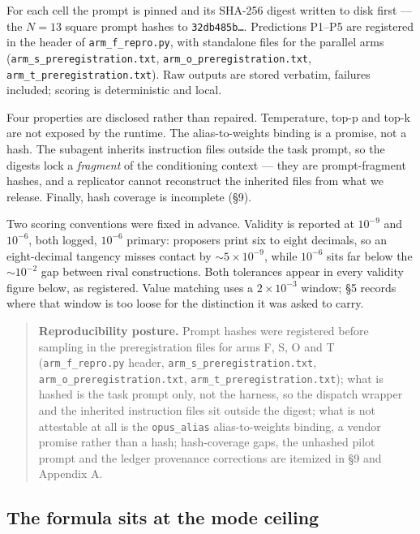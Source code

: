 \documentclass[11pt]{article}
\begin{document}
For each cell the prompt is pinned and its SHA-256 digest written to disk first --- the $N = 13$
square prompt hashes to \texttt{32db485b\dots}. Predictions P1--P5 are registered in the header of
\texttt{arm\_f\_repro.py}, with standalone files for the parallel arms (\texttt{arm\_s\_preregistration.txt},
\texttt{arm\_o\_preregistration.txt}, \texttt{arm\_t\_preregistration.txt}). Raw outputs are stored verbatim,
failures included; scoring is deterministic and local.

Four properties are disclosed rather than repaired. Temperature, top-p and top-k are not exposed
by the runtime. The alias-to-weights binding is a promise, not a hash. The subagent inherits
instruction files outside the task prompt, so the digests lock a \textit{fragment} of the conditioning
context --- they are prompt-fragment hashes, and a replicator cannot reconstruct the inherited
files from what we release. Finally, hash coverage is incomplete (\S9).

Two scoring conventions were fixed in advance. Validity is reported at $10^{-9}$ and $10^{-6}$, both
logged, $10^{-6}$ primary: proposers print six to eight decimals, so an eight-decimal tangency misses
contact by ${\sim}5\times10^{-9}$, while $10^{-6}$ sits far below the ${\sim}10^{-2}$ gap between rival constructions. Both
tolerances appear in every validity figure below, as registered. Value matching uses a $2\times10^{-3}$
window; \S5 records where that window is too loose for the distinction it was asked to carry.

\begin{quote}
\textbf{Reproducibility posture.} Prompt hashes were registered before sampling in the
preregistration files for arms F, S, O and T (\texttt{arm\_f\_repro.py} header, \texttt{arm\_s\_preregistration.txt},
\texttt{arm\_o\_preregistration.txt}, \texttt{arm\_t\_preregistration.txt}); what is hashed is the task prompt
only, not the harness, so the dispatch wrapper and the inherited instruction files sit outside
the digest; what is not attestable at all is the \texttt{opus\_alias} alias-to-weights binding, a vendor
promise rather than a hash; hash-coverage gaps, the unhashed pilot prompt and the ledger
provenance corrections are itemized in \S9 and Appendix A.
\end{quote}

\subsection{The formula sits at the mode ceiling}
\end{document}
